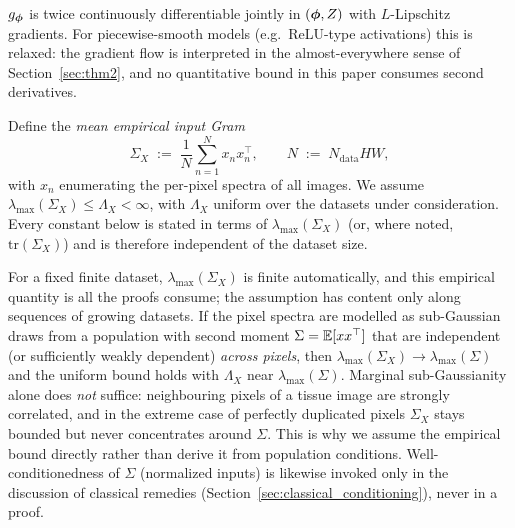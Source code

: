 \begin{assumption}
\label{ass:reg}
$g_{\boldsymbol{\phi}}$ is twice continuously differentiable jointly in
$({\boldsymbol{\phi}}, Z)$ with $L$-Lipschitz gradients. For piecewise-smooth
models (e.g.\
ReLU-type activations) this is relaxed: the gradient flow is
interpreted in the almost-everywhere sense of
Section~\ref{sec:thm2}, and no quantitative bound in this paper
consumes second derivatives.
\end{assumption}

\begin{assumption}
\label{ass:subg}
Define the \emph{mean empirical input Gram}
\begin{equation}
\label{eq:sigma_x}
    \Sigma_X \;:=\; \frac{1}{N} \sum_{n=1}^{N} x_n x_n^\top,
    \qquad N \;:=\; N_{\mathrm{data}} H W,
\end{equation}
with $x_n$ enumerating the per-pixel spectra of all images. We
assume $\lambda_{\max}(\Sigma_X) \leq \Lambda_X < \infty$, with
$\Lambda_X$ uniform over the datasets under consideration. Every
constant below is stated in terms of $\lambda_{\max}(\Sigma_X)$
(or, where noted, $\mathrm{tr}(\Sigma_X)$) and is therefore
independent of the dataset size.
\end{assumption}

\begin{remark}
\label{rem:subg_population}
For a fixed finite dataset, $\lambda_{\max}(\Sigma_X)$ is finite
automatically, and this empirical quantity is all the proofs
consume; the assumption has content only along sequences of growing
datasets. If the pixel spectra are modelled as sub-Gaussian draws
from a population with second moment $\Sigma = \mathbb{E}[x x^\top]$ that
are independent (or sufficiently weakly dependent) \emph{across
pixels}, then $\lambda_{\max}(\Sigma_X) \to \lambda_{\max}(\Sigma)$
and the uniform bound holds with $\Lambda_X$ near
$\lambda_{\max}(\Sigma)$. Marginal sub-Gaussianity alone does
\emph{not} suffice: neighbouring pixels of a tissue image are
strongly correlated, and in the extreme case of perfectly
duplicated pixels $\Sigma_X$ stays bounded but never concentrates
around $\Sigma$. This is why we assume the empirical bound
directly rather than derive it from population conditions.
Well-conditionedness of $\Sigma$ (normalized inputs) is likewise
invoked only in the discussion of classical remedies
(Section~\ref{sec:classical_conditioning}), never in a proof.
\end{remark}

